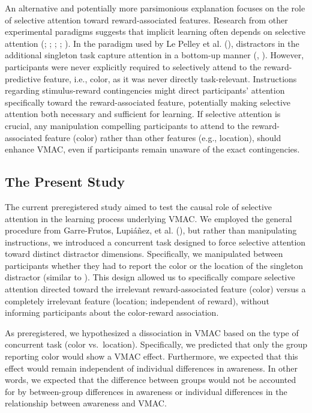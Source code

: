 \documentclass[
  jou,
  floatsintext,
  longtable,
  nolmodern,
  notxfonts,
  notimes,
  colorlinks=true,linkcolor=blue,citecolor=blue,urlcolor=blue]{apa7}
\begin{document}
An alternative and potentially more parsimonious explanation focuses on
the role of selective attention toward reward-associated features.
Research from other experimental paradigms suggests that implicit
learning often depends on selective attention
(;
;
;
;
). In the paradigm used
by Le Pelley et al. (), distractors in
the additional singleton task capture attention in a bottom-up manner
(,
). However, participants were never
explicitly required to selectively attend to the reward-predictive
feature, i.e., color, as it was never directly task-relevant.
Instructions regarding stimulus-reward contingencies might direct
participants' attention specifically toward the reward-associated
feature, potentially making selective attention both necessary and
sufficient for learning. If selective attention is crucial, any
manipulation compelling participants to attend to the reward-associated
feature (color) rather than other features (e.g., location), should
enhance VMAC, even if participants remain unaware of the exact
contingencies.

\subsection{The Present Study}\label{the-present-study}

The current preregistered study aimed to test the causal role of
selective attention in the learning process underlying VMAC. We employed
the general procedure from Garre-Frutos, Lupiáñez, et al.
(), but rather than manipulating
instructions, we introduced a concurrent task designed to force
selective attention toward distinct distractor dimensions. Specifically,
we manipulated between participants whether they had to report the color
or the location of the singleton distractor (similar to
). This design allowed us
to specifically compare selective attention directed toward the
irrelevant reward-associated feature (color) versus a completely
irrelevant feature (location; independent of reward), without informing
participants about the color-reward association.

As preregistered, we hypothesized a dissociation in VMAC based on the
type of concurrent task (color vs.~location). Specifically, we predicted
that only the group reporting color would show a VMAC effect.
Furthermore, we expected that this effect would remain independent of
individual differences in awareness. In other words, we expected that
the difference between groups would not be accounted for by
between-group differences in awareness or individual differences in the
relationship between awareness and VMAC.
\end{document}

